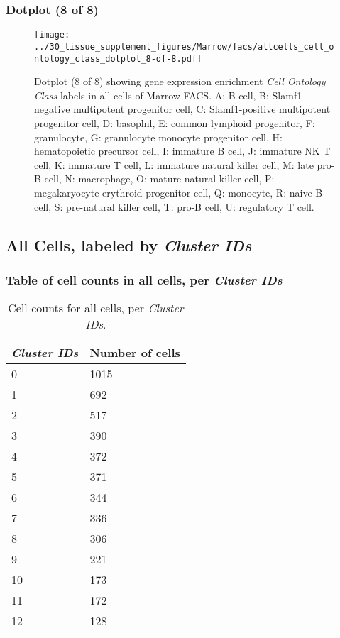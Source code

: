 \subsubsection{Dotplot (8 of 8)}
\begin{figure}[h]
\centering
\texttt{[image: ../30\_tissue\_supplement\_figures/Marrow/facs/allcells\_cell\_ontology\_class\_dotplot\_8-of-8.pdf]}

\caption{ Dotplot (8 of 8)  showing gene expression enrichment \emph{Cell Ontology Class} labels in all cells of Marrow FACS. A: B cell, B: Slamf1-negative multipotent progenitor cell, C: Slamf1-positive multipotent progenitor cell, D: basophil, E: common lymphoid progenitor, F: granulocyte, G: granulocyte monocyte progenitor cell, H: hematopoietic precursor cell, I: immature B cell, J: immature NK T cell, K: immature T cell, L: immature natural killer cell, M: late pro-B cell, N: macrophage, O: mature natural killer cell, P: megakaryocyte-erythroid progenitor cell, Q: monocyte, R: naive B cell, S: pre-natural killer cell, T: pro-B cell, U: regulatory T cell.}
\end{figure}


\clearpage

\subsection{All Cells, labeled by \emph{Cluster IDs}}
\subsubsection{Table of cell counts in all cells, per \emph{Cluster IDs}}\begin{table}[h]
\centering
\label{my-label}
\begin{tabular}{@{}ll@{}}
\toprule

\emph{Cluster IDs}& Number of cells \\ \midrule
0 & 1015 \\

1 & 692 \\

2 & 517 \\

3 & 390 \\

4 & 372 \\

5 & 371 \\

6 & 344 \\

7 & 336 \\

8 & 306 \\

9 & 221 \\

10 & 173 \\

11 & 172 \\

12 & 128 \\
\bottomrule
\end{tabular}
\caption{Cell counts for all cells, per \emph{Cluster IDs}.}
\end{table}

